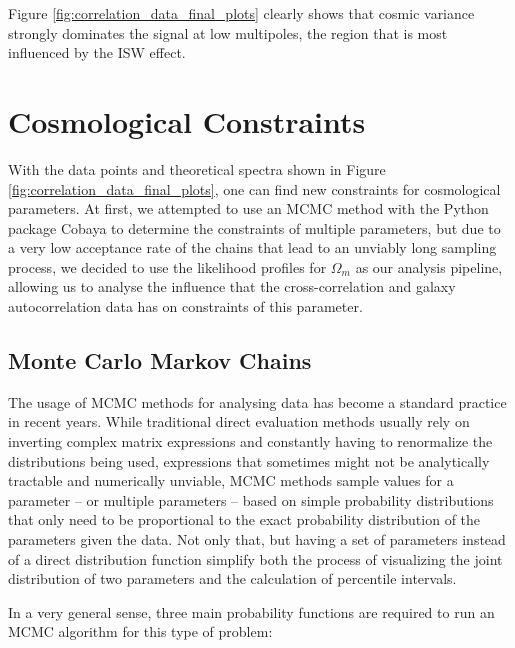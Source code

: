 \documentclass[openany,a4paper,12pt,oneside]{book}
\begin{document}
\begin{spacing}{1.5}
Figure \ref{fig:correlation_data_final_plots} clearly shows that cosmic variance strongly dominates the signal at low multipoles, the region that is most influenced by the ISW effect.


\chapter{Cosmological Constraints}\label{chapter:constraints}

With the data points and theoretical spectra shown in Figure \ref{fig:correlation_data_final_plots}, one can find new constraints for cosmological parameters. At first, we attempted to use an MCMC method with the Python package Cobaya\cite{CobayaASCL, Cobaya_preprint} to determine the constraints of multiple parameters, but due to a very low acceptance rate of the chains that lead to an unviably long sampling process, we decided to use the likelihood profiles for $\Omega_m$ as our analysis pipeline, allowing us to analyse the influence that the cross-correlation and galaxy autocorrelation data has on constraints of this parameter.

\section{Monte Carlo Markov Chains}

The usage of MCMC methods for analysing data has become a standard practice in recent years. While traditional direct evaluation methods usually rely on inverting complex matrix expressions and constantly having to renormalize the distributions being used, expressions that sometimes might not be analytically tractable and numerically unviable, MCMC methods sample values for a parameter -- or multiple parameters -- based on simple probability distributions that only need to be proportional to the exact probability distribution of the parameters given the data. Not only that, but having a set of parameters instead of a direct distribution function simplify both the process of visualizing the joint distribution of two parameters and the calculation of percentile intervals.

In a very general sense, three main probability functions are required to run an MCMC algorithm for this type of problem: 


\end{spacing}
\end{document}

